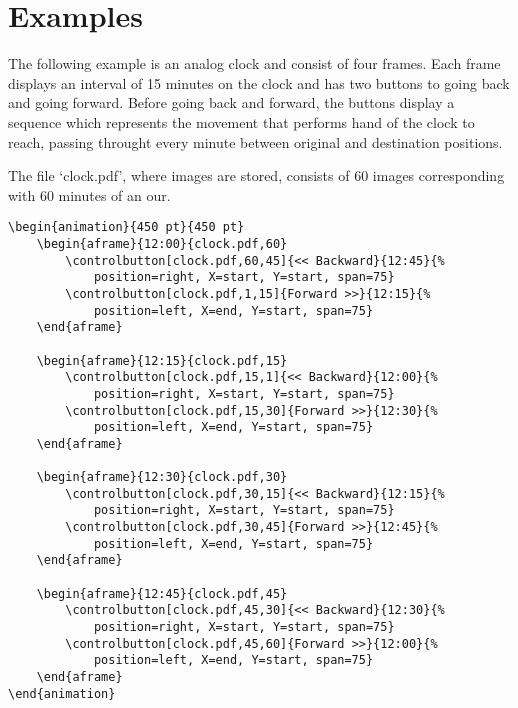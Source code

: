 \documentclass[a4paper,12pt]{article}
\begin{document}
\section{Examples}
The following example is an analog clock and consist of four frames. Each frame displays an interval of 15 minutes on the clock and has two buttons to going back and going forward. Before going back and forward, the buttons display a sequence which represents the movement that performs hand of the clock to reach, passing throught every minute between original and destination positions.

The file `clock.pdf', where images are stored, consists of 60 images cor\-re\-spond\-ing with 60 minutes of an our.

\small
\begin{verbatim}
\begin{animation}{450 pt}{450 pt}
	\begin{aframe}{12:00}{clock.pdf,60}
		\controlbutton[clock.pdf,60,45]{<< Backward}{12:45}{%
			position=right, X=start, Y=start, span=75}
		\controlbutton[clock.pdf,1,15]{Forward >>}{12:15}{%
			position=left, X=end, Y=start, span=75}
	\end{aframe}

	\begin{aframe}{12:15}{clock.pdf,15}
		\controlbutton[clock.pdf,15,1]{<< Backward}{12:00}{%
			position=right, X=start, Y=start, span=75}
		\controlbutton[clock.pdf,15,30]{Forward >>}{12:30}{%
			position=left, X=end, Y=start, span=75}
	\end{aframe}

	\begin{aframe}{12:30}{clock.pdf,30}
		\controlbutton[clock.pdf,30,15]{<< Backward}{12:15}{%
			position=right, X=start, Y=start, span=75}
		\controlbutton[clock.pdf,30,45]{Forward >>}{12:45}{%
			position=left, X=end, Y=start, span=75}
	\end{aframe}

	\begin{aframe}{12:45}{clock.pdf,45}
		\controlbutton[clock.pdf,45,30]{<< Backward}{12:30}{%
			position=right, X=start, Y=start, span=75}
		\controlbutton[clock.pdf,45,60]{Forward >>}{12:00}{%
			position=left, X=end, Y=start, span=75}
	\end{aframe}
\end{animation}
\end{verbatim}
\normalsize
\end{document}
